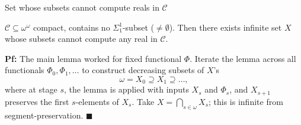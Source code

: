 \begin{frame}{Set whose subsets cannot compute reals in $\mathcal{C}$}
  \begin{main-thm*}
    $\mathcal{C}\subseteq\omega^\omega$ compact, contains no
    $\Sigma_1^1$-subset ($\neq\emptyset$). Then there exists infinite set
    $X$ whose subsets cannot compute any real in $\mathcal{C}$.
  \end{main-thm*}

  \vspace{1em}
  \textbf{Pf:} The main lemma worked for fixed functional $\Phi$. Iterate
  the lemma across all functionals $\Phi_0,\Phi_1,\ldots$ to construct
  decreasing subsets of $X$'s
  \[\omega= X_0\supseteq X_1\supseteq\ldots,\]
  where at stage $s$, the lemma is applied with inputs $X_s$ and
  $\Phi_s$, and $X_{s+1}$ preserves the first $s$-elements of $X_s$. Take
  $X=\bigcap_{s\in\omega}X_s$; this is infinite from segment-preservation.
  $\blacksquare$
\end{frame}
